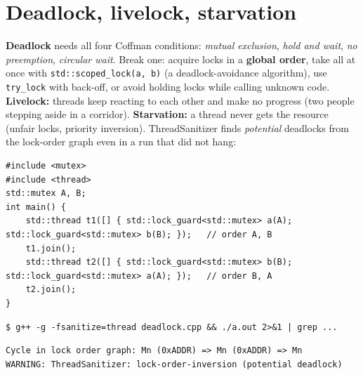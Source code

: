 \documentclass[10pt,a4paper,openany,oneside]{report}
\newcommand{\prio}[1]{\texorpdfstring{\ifcase#1\or{\color{gold}\ding{72}}\or{\color{gold}\ding{72}\ding{72}}\or{\color{gold}\ding{72}\ding{72}\ding{72}}\fi}{}}
\begin{document}
\section{Deadlock, livelock, starvation \prio{2}}
\textbf{Deadlock} needs all four Coffman conditions: \emph{mutual exclusion}, \emph{hold and wait}, \emph{no preemption}, \emph{circular wait}. Break one: acquire locks in a \textbf{global order}, take all at once with \texttt{std::scoped\_lock(a, b)} (a deadlock-avoidance algorithm), use \texttt{try\_lock} with back-off, or avoid holding locks while calling unknown code. \textbf{Livelock:} threads keep reacting to each other and make no progress (two people stepping aside in a corridor). \textbf{Starvation:} a thread never gets the resource (unfair locks, priority inversion). ThreadSanitizer finds \emph{potential} deadlocks from the lock-order graph even in a run that did not hang:
\begin{lstlisting}[language={[11]C++},title={deadlock.cpp: opposite lock orders, run one after the other so nothing hangs}]
#include <mutex>
#include <thread>
std::mutex A, B;
int main() {
    std::thread t1([] { std::lock_guard<std::mutex> a(A); std::lock_guard<std::mutex> b(B); });   // order A, B
    t1.join();
    std::thread t2([] { std::lock_guard<std::mutex> b(B); std::lock_guard<std::mutex> a(A); });   // order B, A
    t2.join();
}
\end{lstlisting}
\begin{lstlisting}[style=shcmd]
$ g++ -g -fsanitize=thread deadlock.cpp && ./a.out 2>&1 | grep ...
\end{lstlisting}
\begin{lstlisting}[style=out]
  Cycle in lock order graph: Mn (0xADDR) => Mn (0xADDR) => Mn
WARNING: ThreadSanitizer: lock-order-inversion (potential deadlock) 
\end{lstlisting}
\end{document}
